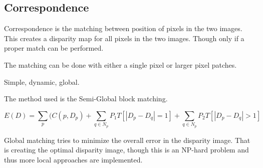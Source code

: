 %
%
%
%
%
%

\subsection{Correspondence} \label{sec:correspondence}

Correspondence is the matching between position of pixels in the two images. This creates a disparity map for all pixels in the two images. Though only if a proper match can be performed.

The matching can be done with either a single pixel or larger pixel patches.

Simple, dynamic, global.

The method used is the Semi-Global block matching.

\[ E(D) = \sum\limits_{p}(C(p,D_{p}) + \sum\limits_{q \in N_{p} } P_{1} T [|D_{p} - D_{q}| = 1] + \sum\limits_{q \in N_{p} } P_{2} T [|D_{p} - D_{q}| > 1] \]

Global matching tries to minimize the overall error in the disparity image. That is creating the optimal disparity image, though this is an NP-hard problem and thus more local approaches are implemented. 

